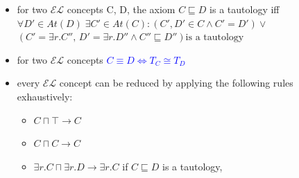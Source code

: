 \documentclass[12pt,a4paper]{article}
\newcommand{\blue}[1]{\textcolor{blue} {#1}}
\newcommand{\sse}{\sqsubseteq}
\newcommand{\sand}{\sqcap}
\begin{document}
\begin{itemize}
\item for two $\mathcal{EL}$ concepts C, D, the axiom $C\sse D$ is a tautology iff $\forall D'\in At(D) \; \exists C'\in At(C): (C',D'\in C \land C'=D') \lor$\\$(C'=\exists r.C'',\,D'=\exists r.D'' \land C''\sse D'') \text{is a tautology}$
\item for two $\mathcal{EL}$ concepts \blue{$C\equiv D \Leftrightarrow T_C \cong T_D$}
\item every $\mathcal{EL}$ concept can be reduced by applying the following rules exhaustively:
\begin{itemize}
\item $C \sand \top \rightarrow C$
\item $C \sand C \rightarrow C$
\item $\exists r.C \sand \exists r.D \rightarrow \exists r.C $ if $ C\sse D$ is a tautology,
\end{itemize}
\end{itemize}
\end{document}
